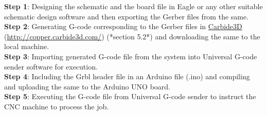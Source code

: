 
\hspace{-13.7mm}
\textbf{Step 1}: Designing the schematic and the board file in Eagle or any other suitable schematic design software and then exporting the Gerber files from the same. \\[5mm]
\textbf{Step 2}: Generating G-code corresponding to the Gerber files in \href{http://copper.carbide3d.com/}{Carbide3D} (\url{http://copper.carbide3d.com/}) (*section 5.2*) and downloading the same to the local machine. \\[5mm]
\textbf{Step 3}: Importing generated G-code file from the system into Universal G-code sender software for execution. \\[5mm]
\textbf{Step 4}: Including the Grbl header file in an Arduino file (.ino) and compiling and uploading the same to the Arduino UNO board. \\[5mm]
\textbf{Step 5}: Executing the G-code file from Universal G-code sender to instruct the CNC machine to process the job.
